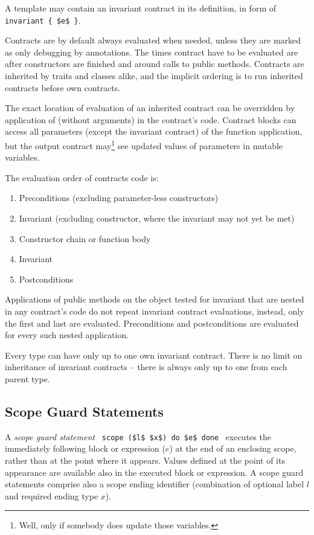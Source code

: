 A template may contain an invariant contract in its definition, in form of \lstinline!invariant { $e$ }!.

Contracts are by default always evaluated when needed, unless they are marked as only debugging by annotations. The times contract have to be evaluated are after constructors are finished and around calls to public methods. Contracts are inherited by traits and classes alike, and the implicit ordering is to run inherited contracts before own contracts. 

The exact location of evaluation of an inherited contract can be overridden by application of  (without arguments) in the contract's code. Contract blocks can access all parameters (except the invariant contract) of the function application, but the output contract may\footnote{Well, only if somebody does update those variables.} see updated values of parameters in mutable variables. 

The evaluation order of contracts code is:
\begin{enumerate}
  \item Preconditions (excluding parameter-less constructors)
  \item Invariant (excluding constructor, where the invariant may not yet be met)
  \item Constructor chain or function body
  \item Invariant
  \item Postconditions
\end{enumerate}

Applications of public methods on the object tested for invariant that are nested in any contract's code do not repeat invariant contract evaluations, instead, only the first and last are evaluated. Preconditions and postconditions are evaluated for every such nested application. 

Every type can have only up to one own invariant contract. There is no limit on inheritance of invariant contracts -- there is always only up to one from each parent type. 





\subsection{Scope Guard Statements}

A {\em scope guard statement} ~\lstinline!scope ($l$ $x$) do $e$ done!~ executes the immediately following block or expression ($e$) at the end of an enclosing scope, rather than at the point where it appears. Values defined at the point of its appearance are available also in the executed block or expression. A scope guard statements comprise also a scope ending identifier (combination of optional label $l$ and required ending type $x$). 

